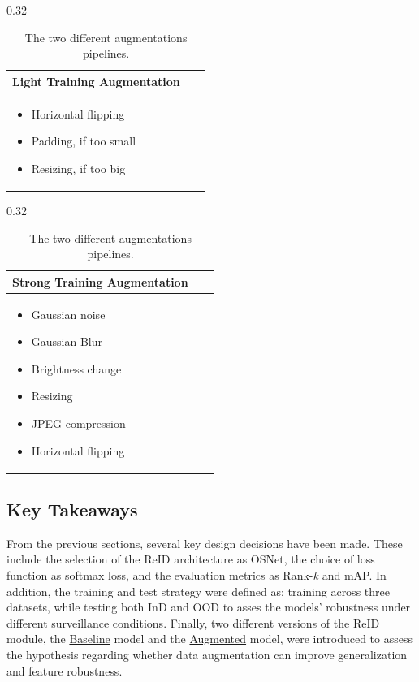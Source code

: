 \begin{table}[H]
\centering
\begin{subtable}[T]{0.32\linewidth}
\centering
\begin{tabular}{|>{\centering\arraybackslash}p{0.9\linewidth}|}\hline
\cellcolor[HTML]{D8E9F7} \textbf{Light Training Augmentation}\\\hline
\begin{itemize}[leftmargin=*, topsep=0pt, itemsep=0pt]
    \item Horizontal flipping
    \item Padding, if too small
    \item Resizing, if too big
    \vspace{6.1em}
\end{itemize}
\\ \hline\end{tabular}
\caption{Augmentations used for the baseline version of \acs{OSNet}.}
\end{subtable}
\begin{subtable}[T]{0.32\linewidth}
\centering
\begin{tabular}{|>{\centering\arraybackslash}p{0.9\linewidth}|}\hline
\cellcolor[HTML]{D8E9F7} \textbf{Strong Training Augmentation}\\\hline
\begin{itemize}[leftmargin=*, topsep=0pt, itemsep=0pt]
    \item Gaussian noise
    \item Gaussian Blur
    \item Brightness change
    \item Resizing
    \item JPEG compression
    \item Horizontal flipping
    \vspace{1em}
\end{itemize}
\\ \hline\end{tabular}
\caption{Augmentation used for the augmented version of \acs{OSNet}.}
\end{subtable}
\caption{The two different augmentations pipelines.}
\label{tab:three_subtables}
\end{table}

\subsection{Key Takeaways}
From the previous sections, several key design decisions have been made. These include the selection of the \acs{ReID} architecture as \acs{OSNet}, the choice of loss function as softmax loss, and the evaluation metrics as Rank-\textit{k} and \acs{mAP}. In addition, the training and test strategy were defined as: training across three datasets, while testing both \acf{InD} and \acs{OOD} to asses the models' robustness under different surveillance conditions.
Finally, two different versions of the \acs{ReID} module, the \hyperlink{model:baseline}{Baseline} model and the \hyperlink{model:augmented}{Augmented} model, were introduced to assess the hypothesis regarding whether data augmentation can improve generalization and feature robustness.

